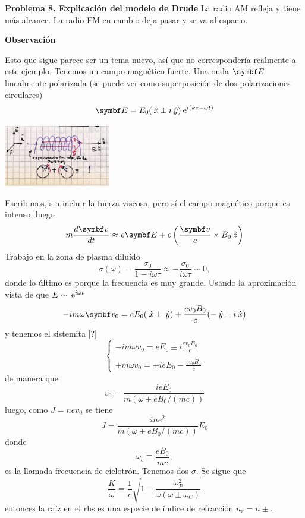 \documentclass[10pt,oneside]{CBFT_book}
\begin{document}
\begin{ejemplo}{\bf Problema 8. Explicación del modelo de Drude}
La radio AM refleja y tiene más alcance. La radio FM en cambio deja pasar y se va al espacio.

{\bf Observación}

Esto que sigue parece ser un tema nuevo, así que no correspondería realmente a este ejemplo.
Tenemos un campo magnético fuerte.
Una onda $\vb{E}$ linealmente polarizada (se puede ver como superposición de dos polarizaciones
circulares)
\[
	\vb{E} = E_0 ( \xver \pm i \yver ) \euler^{i (kz -\omega t)}
\]

\includegraphics[width=0.35\textwidth]{images/fig_ft1_problema8E.jpg} 

Escribimos, sin incluir la fuerza viscosa, pero sí el campo magnético porque es intenso, luego
\[
	m \dtot{\vb{v}}{t} \approx e \vb{E} + e \left( \frac{\vb{v}}{c} \times B_0\zver \right)
\]
Trabajo en la zona de plasma diluído
\[
	\sigma(\omega) = \frac{\sigma_0}{1-i\omega\tau} \approx -\frac{\sigma_0}{i\omega\tau} \sim 0,
\]
donde lo último es porque la frecuencia es muy grande.
Usando la aproximación vista de que $ E \sim \:\mathrm{e}^{ i \omega t } $
\[
	- i m \omega \vb{v}_0 = e E_0 (\xver \pm \yver ) + \frac{e v_0 B_0 }{c} (-\yver \pm i\xver ) 
\]
y tenemos el sistemita [?]
\[
	\begin{cases}
	- i m \omega v_0 = eE_0 \pm i \frac{e v_0 B_0}{c} \\
	\\
	\pm m \omega v_0 = \pm i e E_0 - \frac{e v_0 B_0}{c}
	\end{cases}
\]
de manera que
\[
	v_0 = \frac{ i e E_0}{m( \omega \pm e B_0 / (mc) )}
\]
luego, como $ J = n e v_0$ se tiene
\[
	J = \frac{ i n e^2 }{m( \omega \pm e B_0 / (mc) )} E_0
\]
donde 
\[
	\omega_c \equiv \frac{e B_0}{m c},
\]
es la llamada frecuencia de ciclotrón. Tenemos dos $\sigma$. Se sigue que
\[
	\frac{K}{\omega} = \frac{1}{c} \sqrt{ 1 - \frac{ \omega_P^2 }{ \omega (\omega \pm \omega_C )} }
\]
entonces la raíz en el rhs es una especie de índice de refracción $n_r = n\pm$.


\end{ejemplo}
\end{document}
